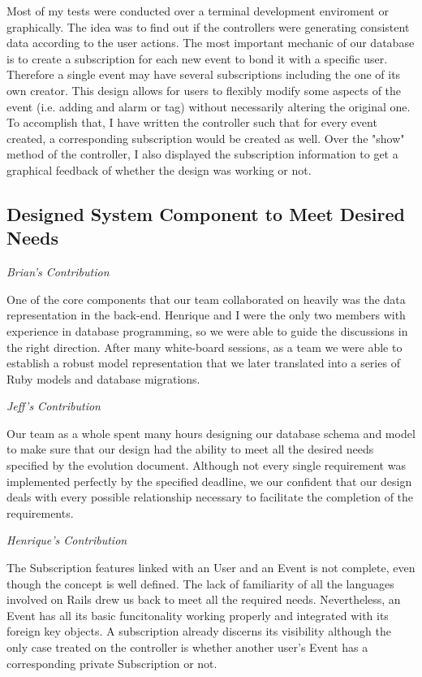 \documentclass[11pt]{article}
\begin{document}
Most of my tests were conducted over a terminal development enviroment or graphically. The idea was to find out if the controllers were generating consistent data according to the user actions. The most important mechanic of our database is to create a subscription for each new event to bond it with a specific user. Therefore a single event may have several subscriptions including the one of its own creator. This design allows for users to flexibly modify some aspects of the event (i.e. adding and alarm or tag) without necessarily altering the original one. To accomplish that, I have written the controller such that for every event created, a corresponding subscription would be created as well. Over the "show" method of the controller, I also displayed the subscription information to get a graphical feedback of whether the design was working or not. 

\subsection{Designed System Component to Meet Desired Needs}

\textit{Brian's Contribution}

One of the core components that our team collaborated on heavily was the data representation in the back-end. Henrique and I were the only two members with experience in database programming, so we were able to guide the discussions in the right direction. After many white-board sessions, as a team we were able to establish a robust model representation that we later translated into a series of Ruby models and database migrations. 

\textit{Jeff's Contribution}

Our team as a whole spent many hours designing our database schema and model to make sure that our design had the ability to meet all the desired needs specified by the evolution document.  Although not every single requirement was implemented perfectly by the specified deadline, we our confident that our design deals with every possible relationship necessary to facilitate the completion of the requirements.

\textit{Henrique's Contribution}

The Subscription features linked with an User and an Event is not complete, even though the concept is well defined. The lack of familiarity of all the languages involved on Rails drew us back to meet all the required needs. Nevertheless, an Event has all its basic funcitonality working properly and integrated with its foreign key objects. A subscription already discerns its visibility although the only case treated on the controller is whether another user's Event has a corresponding private Subscription or not. 
\end{document}
